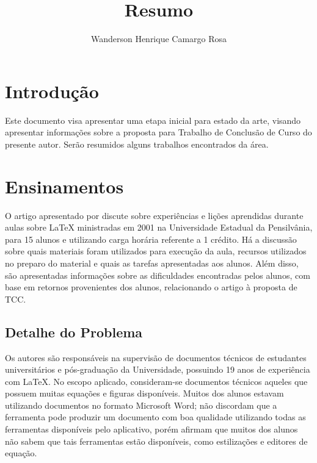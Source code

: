 \documentclass{article}
\title{Resumo}
\author{Wanderson Henrique Camargo Rosa\inst{1}}
\begin{document}
\maketitle{}

\section{Introdução}
\label{sec:intro}

Este documento visa apresentar uma etapa inicial para estado da arte, visando
apresentar informações sobre a proposta para Trabalho de Conclusão de Curso do
presente autor. Serão resumidos alguns trabalhos encontrados da área.

\section{Ensinamentos}
\label{sec:ensin}

O artigo apresentado por \cite{gray2003} discute sobre experiências e lições
aprendidas durante aulas sobre \LaTeX{} ministradas em 2001 na Universidade
Estadual da Pensilvânia, para 15 alunos e utilizando carga horária referente a 1
crédito. Há a discussão sobre quais materiais foram utilizados para execução da
aula, recursos utilizados no preparo do material e quais as tarefas apresentadas
aos alunos. Além disso, são apresentadas informações sobre as dificuldades
encontradas pelos alunos, com base em retornos provenientes dos alunos,
relacionando o artigo à proposta de TCC.

\subsection{Detalhe do Problema}

Os autores são responsáveis na supervisão de documentos técnicos de estudantes
universitários e pós-graduação da Universidade, possuindo 19 anos de experiência
com \LaTeX{}. No escopo aplicado, consideram-se documentos técnicos aqueles que
possuem muitas equações e figuras disponíveis. Muitos dos alunos estavam
utilizando documentos no formato Microsoft Word\texttrademark{}; não discordam
que a ferramenta pode produzir um documento com boa qualidade utilizando todas
as ferramentas disponíveis pelo aplicativo, porém afirmam que muitos dos alunos
não sabem que tais ferramentas estão disponíveis, como estilizações e editores
de equação.
\end{document}
